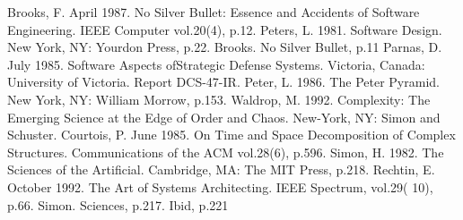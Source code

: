 \documentclass[11pt,a4paper]{article}
\begin{document}
\begin{thebibliography}{}
     Brooks, F. April 1987. No Silver Bullet: Essence and Accidents of Software Engineering. IEEE Computer vol.20(4), p.12. 
     Peters, L. 1981. Software Design. New York, NY: Yourdon Press, p.22. 
     Brooks. No Silver Bullet, p.11
     Parnas, D. July 1985. Software Aspects ofStrategic Defense Systems. Victoria, Canada: University of Victoria. Report DCS-47-IR. 
     Peter, L. 1986. The Peter Pyramid. New York, NY: William Morrow, p.153. 
     Waldrop, M. 1992. Complexity: The Emerging Science at the Edge of Order and Chaos. New-York, NY: Simon and Schuster. 
     Courtois, P. June 1985. On Time and Space Decomposition of Complex Structures. Communications of the ACM vol.28(6), p.596. 
     Simon, H. 1982. The Sciences of the Artificial. Cambridge, MA: The MIT Press, p.218. 
     Rechtin, E. October 1992. The Art of Systems Architecting. IEEE Spectrum, vol.29( 10), p.66. 
     Simon. Sciences, p.217. 
     Ibid, p.221
\end{thebibliography}
\end{document}
